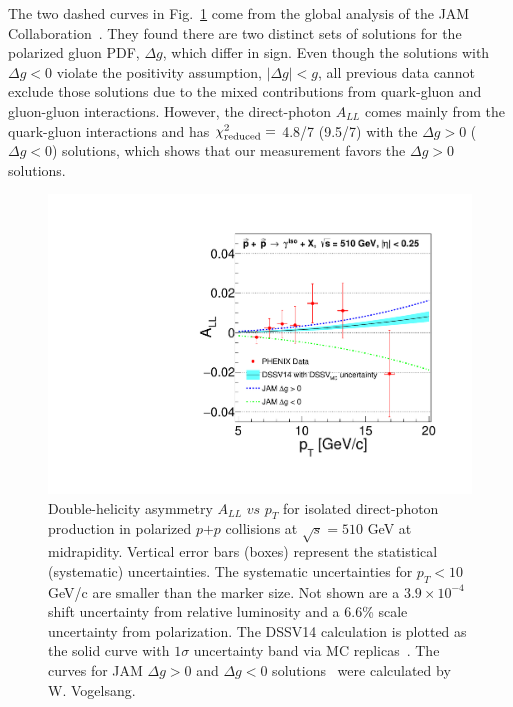 \documentclass[twocolumn,letterpaper,aps,prl,longbibliography,superscriptaddress,floatfix]{revtex4-2}
\newcommand{\ALL}{\mbox{$A_{LL}$}\xspace}
\begin{document}
The two dashed curves in Fig.~\ref{fig:all} come from the global
analysis of the JAM Collaboration~\cite{PhysRevD.105.074022}. They found
there are two distinct sets of solutions for the polarized gluon PDF,
$\Delta g$, which differ in sign. Even though the solutions with
$\Delta g<0$ violate the positivity assumption, $|\Delta g|<g$, all
previous data cannot exclude those solutions due to the mixed
contributions from quark-gluon and gluon-gluon interactions.  However,
the direct-photon \ALL comes mainly from the quark-gluon interactions and
has $\chi_{\rm reduced}^2 =$ 4.8/7 (9.5/7) with the $\Delta g>0$
($\Delta g<0$) solutions, which shows that our measurement favors
the $\Delta g>0$ solutions.

\begin{figure}[htb]
\includegraphics[width=1.0\linewidth]{IsoPhotonALL-beam2.pdf}
\caption{Double-helicity asymmetry $A_{LL}$ $vs$ $p_{T}$ for isolated 
direct-photon production in polarized $p$$+$$p$ collisions at 
$\sqrt{s}=510$ GeV at midrapidity. Vertical error bars (boxes) represent 
the statistical (systematic) uncertainties. The systematic uncertainties
for $p_T < 10$ GeV/c are smaller than the marker size. Not shown are
a $3.9{\times}10^{-4}$ shift uncertainty from relative luminosity and 
a 6.6\% scale uncertainty from polarization. The DSSV14 calculation is 
plotted as the solid curve with $1\sigma$ uncertainty band via MC 
replicas~\protect\cite{PhysRevLett.101.072001,PhysRevLett.113.012001,PhysRevD.100.114027}. 
The curves for JAM $\Delta g>0$ and $\Delta g<0$ 
solutions~\cite{PhysRevD.105.074022} were calculated by W. Vogelsang.
}
\label{fig:all}
\end{figure}
\end{document}
